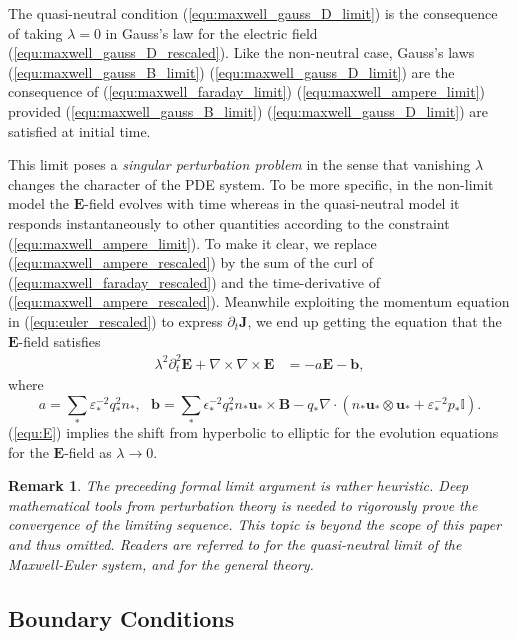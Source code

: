 \documentclass{article}
\newtheorem*{remark}{Remark}
\begin{document}
The quasi-neutral condition (\ref{equ:maxwell_gauss_D_limit}) is the consequence of taking $\lambda = 0$ in Gauss's law for the electric field (\ref{equ:maxwell_gauss_D_rescaled}). Like the non-neutral case, Gauss's laws (\ref{equ:maxwell_gauss_B_limit}) (\ref{equ:maxwell_gauss_D_limit}) are the consequence of (\ref{equ:maxwell_faraday_limit}) (\ref{equ:maxwell_ampere_limit}) provided (\ref{equ:maxwell_gauss_B_limit}) (\ref{equ:maxwell_gauss_D_limit}) are satisfied at initial time. 


This limit poses a \emph{singular perturbation problem} in the sense that vanishing $\lambda$ changes the character of the PDE system. To be more specific, in the non-limit model the $\mathbf{E}$-field evolves with time whereas in the quasi-neutral model it responds instantaneously to other quantities according to the constraint (\ref{equ:maxwell_ampere_limit}). To make it clear, we replace (\ref{equ:maxwell_ampere_rescaled}) by the sum of the curl of (\ref{equ:maxwell_faraday_rescaled}) and the time-derivative of (\ref{equ:maxwell_ampere_rescaled}). Meanwhile exploiting the momentum equation in (\ref{equ:euler_rescaled}) to express $\partial_t\mathbf{J}$, we end up getting the equation that the $\mathbf{E}$-field satisfies
\begin{align}
    \lambda^2\partial_t^2 \mathbf{E} + \nabla \times \nabla \times \mathbf{E} &= - a\mathbf{E} - \mathbf{b}, \label{equ:E}
\end{align}
where
\begin{equation*}
    a = \sum_*\varepsilon_*^{-2}q_*^2n_*, \ \ \ \mathbf{b} = \sum_* \epsilon_*^{-2}q_*^2n_*\mathbf{u}_*\times\mathbf{B} - q_*\nabla\cdot(n_* \mathbf{u}_* \otimes \mathbf{u}_* + \varepsilon_*^{-2}p_*\mathbb{I}).
\end{equation*}
 (\ref{equ:E}) implies the shift from hyperbolic to elliptic for the evolution equations for the $\mathbf{E}$-field as $\lambda\rightarrow0$. 

\begin{remark}
    The preceeding formal limit argument is rather heuristic. Deep mathematical tools from perturbation theory is needed to rigorously prove the convergence of the limiting sequence. This topic is beyond the scope of this paper and thus omitted. Readers are referred to \cite[ch. 2]{remi_2014} \cite{Peng_2008} for the quasi-neutral limit of the Maxwell-Euler system, and \cite{mark_1995, Eckhaus_1980} for the general theory.
\end{remark} 

\subsection{Boundary Conditions} \label{sec:BC}
\end{document}
